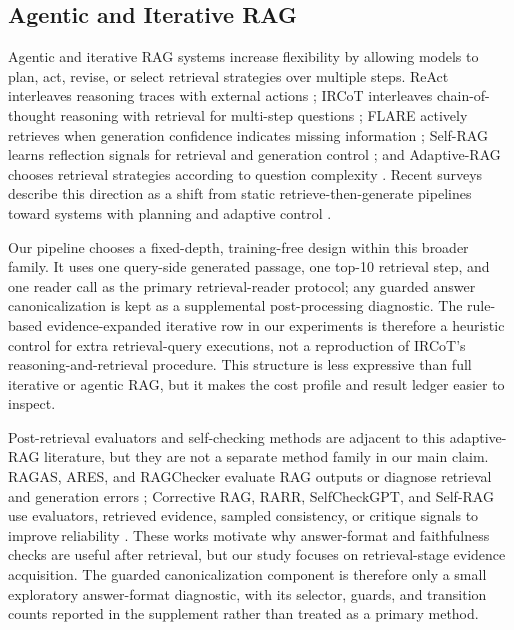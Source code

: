 \subsection{Agentic and Iterative RAG}
\label{sec:rw_agentic_rag}

Agentic and iterative RAG systems increase flexibility by allowing models to plan, act, revise, or select retrieval strategies over multiple steps. ReAct interleaves reasoning traces with external actions \cite{yao2022react}; IRCoT interleaves chain-of-thought reasoning with retrieval for multi-step questions \cite{trivedi2022ircot}; FLARE actively retrieves when generation confidence indicates missing information \cite{jiang2023flare}; Self-RAG learns reflection signals for retrieval and generation control \cite{asai2023selfrag}; and Adaptive-RAG chooses retrieval strategies according to question complexity \cite{jeong2024adaptiverag}. Recent surveys describe this direction as a shift from static retrieve-then-generate pipelines toward systems with planning and adaptive control \cite{singh2025agenticrag}.

Our pipeline chooses a fixed-depth, training-free design within this broader family. It uses one query-side generated passage, one top-10 retrieval step, and one reader call as the primary retrieval-reader protocol; any guarded answer canonicalization is kept as a supplemental post-processing diagnostic. The rule-based evidence-expanded iterative row in our experiments is therefore a heuristic control for extra retrieval-query executions, not a reproduction of IRCoT's reasoning-and-retrieval procedure. This structure is less expressive than full iterative or agentic RAG, but it makes the cost profile and result ledger easier to inspect.

Post-retrieval evaluators and self-checking methods are adjacent to this adaptive-RAG literature, but they are not a separate method family in our main claim. RAGAS, ARES, and RAGChecker evaluate RAG outputs or diagnose retrieval and generation errors \cite{es2023ragas,saadfalcon2023ares,ru2024ragchecker}; Corrective RAG, RARR, SelfCheckGPT, and Self-RAG use evaluators, retrieved evidence, sampled consistency, or critique signals to improve reliability \cite{yan2024crag,gao2022rarr,manakul2023selfcheckgpt,asai2023selfrag}. These works motivate why answer-format and faithfulness checks are useful after retrieval, but our study focuses on retrieval-stage evidence acquisition. The guarded canonicalization component is therefore only a small exploratory answer-format diagnostic, with its selector, guards, and transition counts reported in the supplement rather than treated as a primary method.

